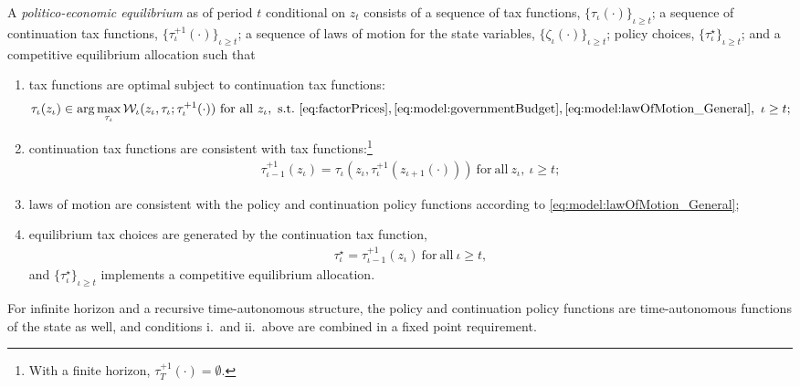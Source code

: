 \begin{definition}\label{def:PEE}
A \emph{politico-economic equilibrium} as of period $t$ conditional on $z_t$ consists of a sequence of tax functions, $\{ \tau_{\iota}(\cdot) \}_{\iota \geq t}$; a sequence of continuation tax functions, $\{ \tau_{\iota}^{+1}(\cdot) \}_{\iota \geq t}$; a sequence of laws of motion for the state variables, $\{ \zeta_{\iota}(\cdot) \}_{ \iota \geq t}$; policy choices, $\{\tau^{\star}_{{\iota}} \}_{ \iota \geq t}$; and a competitive equilibrium allocation such that
\begin{enumerate}
    \item tax functions are optimal subject to continuation tax functions:
    \begin{align*}
        \tau_{\iota}(z_{\iota}) \in \arg \max_{\tau_{\iota}} \mathcal{W}_{\iota} (z_{\iota},\tau_{\iota};\tau_{\iota}^{+1}(\cdot)) \ \mathrm{for\ all} \ z_{\iota}, \ \mathrm{s.t.} \ \eqref{eq:factorPrices}, \eqref{eq:model:governmentBudget}, \eqref{eq:model:lawOfMotion_General}, \ \iota \geq t;
    \end{align*}
    \item continuation tax functions are consistent with tax functions:\footnote{With a finite horizon, $\tau^{+1}_T(\cdot)=\emptyset$.}
    \begin{align*}
        \tau_{\iota-1}^{+1}(z_{\iota}) = \tau_{\iota}\left(z_{\iota}, \tau_{\iota}^{+1}(z_{\iota+1}(\cdot))\right) \ \mathrm{for\ all} \ z_{\iota}, \ \iota \geq t;
    \end{align*}
    \item laws of motion are consistent with the policy and continuation policy functions according to \eqref{eq:model:lawOfMotion_General};
    \item equilibrium tax choices are generated by the continuation tax function,
    \begin{align*}
        \tau^{\star}_{\iota} = \tau_{\iota-1}^{+1}(z_{\iota}) \ \mathrm{for\ all} \ \iota \geq t,
    \end{align*}
    and $\{\tau^{\star}_{\iota} \}_{ \iota \geq t} $ implements a competitive equilibrium allocation.
\end{enumerate}
\end{definition}
For infinite horizon and a recursive time-autonomous structure, the policy and continuation policy functions are time-autonomous functions of the state as well, and conditions i.\ and ii.\ above are combined in a fixed point requirement.

